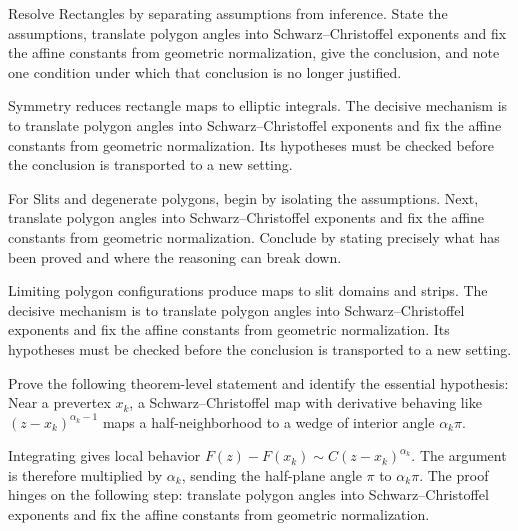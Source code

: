 \begin{problem}\label{prob:iv18-problem-07}
Resolve Rectangles by separating assumptions from inference. State the assumptions, translate polygon angles into Schwarz--Christoffel exponents and fix the affine constants from geometric normalization, give the conclusion, and note one condition under which that conclusion is no longer justified.
\end{problem}
\begin{solution}
Symmetry reduces rectangle maps to elliptic integrals. The decisive mechanism is to translate polygon angles into Schwarz--Christoffel exponents and fix the affine constants from geometric normalization. Its hypotheses must be checked before the conclusion is transported to a new setting.
\end{solution}

\begin{problem}\label{prob:iv18-problem-08}
For Slits and degenerate polygons, begin by isolating the assumptions. Next, translate polygon angles into Schwarz--Christoffel exponents and fix the affine constants from geometric normalization. Conclude by stating precisely what has been proved and where the reasoning can break down.
\end{problem}
\begin{solution}
Limiting polygon configurations produce maps to slit domains and strips. The decisive mechanism is to translate polygon angles into Schwarz--Christoffel exponents and fix the affine constants from geometric normalization. Its hypotheses must be checked before the conclusion is transported to a new setting.
\end{solution}

\begin{problem}\label{prob:iv18-problem-09}
Prove the following theorem-level statement and identify the essential hypothesis: Near a prevertex $x_k$, a Schwarz–Christoffel map with derivative behaving like $(z-x_k)^{\alpha_k-1}$ maps a half-neighborhood to a wedge of interior angle $\alpha_k\pi$.
\end{problem}
\begin{solution}
Integrating gives local behavior $F(z)-F(x_k)\sim C(z-x_k)^{\alpha_k}$. The argument is therefore multiplied by $\alpha_k$, sending the half-plane angle $\pi$ to $\alpha_k\pi$. The proof hinges on the following step: translate polygon angles into Schwarz--Christoffel exponents and fix the affine constants from geometric normalization.
\end{solution}

